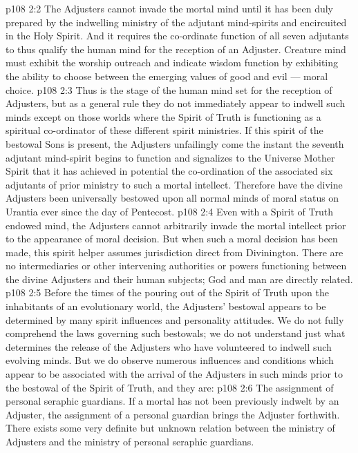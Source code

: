 \vs p108 2:2 \pc The Adjusters cannot invade the mortal mind until it has been duly prepared by the indwelling ministry of the adjutant mind\hyp{}spirits and encircuited in the Holy Spirit. And it requires the co\hyp{}ordinate function of all seven adjutants to thus qualify the human mind for the reception of an Adjuster. Creature mind must exhibit the worship outreach and indicate wisdom function by exhibiting the ability to choose between the emerging values of good and evil --- moral choice.
\vs p108 2:3 Thus is the stage of the human mind set for the reception of Adjusters, but as a general rule they do not immediately appear to indwell such minds except on those worlds where the Spirit of Truth is functioning as a spiritual co\hyp{}ordinator of these different spirit ministries. If this spirit of the bestowal Sons is present, the Adjusters unfailingly come the instant the seventh adjutant mind\hyp{}spirit begins to function and signalizes to the Universe Mother Spirit that it has achieved in potential the co\hyp{}ordination of the associated six adjutants of prior ministry to such a mortal intellect. Therefore have the divine Adjusters been universally bestowed upon all normal minds of moral status on Urantia ever since the day of Pentecost.
\vs p108 2:4 Even with a Spirit of Truth endowed mind, the Adjusters cannot arbitrarily invade the mortal intellect prior to the appearance of moral decision. But when such a moral decision has been made, this spirit helper assumes jurisdiction direct from Divinington. There are no intermediaries or other intervening authorities or powers functioning between the divine Adjusters and their human subjects; God and man are directly related.
\vs p108 2:5 Before the times of the pouring out of the Spirit of Truth upon the inhabitants of an evolutionary world, the Adjusters’ bestowal appears to be determined by many spirit influences and personality attitudes. We do not fully comprehend the laws governing such bestowals; we do not understand just what determines the release of the Adjusters who have volunteered to indwell such evolving minds. But we do observe numerous influences and conditions which appear to be associated with the arrival of the Adjusters in such minds prior to the bestowal of the Spirit of Truth, and they are:
\vs p108 2:6 \bibnobreakspace The assignment of personal seraphic guardians. If a mortal has not been previously indwelt by an Adjuster, the assignment of a personal guardian brings the Adjuster forthwith. There exists some very definite but unknown relation between the ministry of Adjusters and the ministry of personal seraphic guardians.
